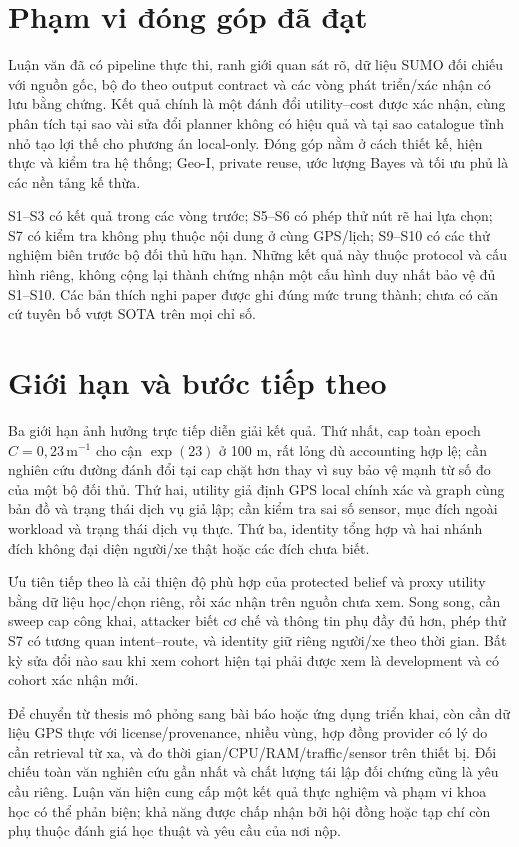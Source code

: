\section{Phạm vi đóng góp đã đạt}

Luận văn đã có pipeline thực thi, ranh giới quan sát rõ, dữ liệu SUMO đối chiếu với nguồn gốc, bộ đo theo output contract và các vòng phát triển/xác nhận có lưu bằng chứng. Kết quả chính là một đánh đổi utility--cost được xác nhận, cùng phân tích tại sao vài sửa đổi planner không có hiệu quả và tại sao catalogue tĩnh nhỏ tạo lợi thế cho phương án local-only. Đóng góp nằm ở cách thiết kế, hiện thực và kiểm tra hệ thống; Geo-I, private reuse, ước lượng Bayes và tối ưu phủ là các nền tảng kế thừa.

S1--S3 có kết quả trong các vòng trước; S5--S6 có phép thử nút rẽ hai lựa chọn; S7 có kiểm tra không phụ thuộc nội dung ở cùng GPS/lịch; S9--S10 có các thử nghiệm biên trước bộ đối thủ hữu hạn. Những kết quả này thuộc protocol và cấu hình riêng, không cộng lại thành chứng nhận một cấu hình duy nhất bảo vệ đủ S1--S10. Các bản thích nghi paper được ghi đúng mức trung thành; chưa có căn cứ tuyên bố vượt SOTA trên mọi chỉ số.

\section{Giới hạn và bước tiếp theo}

Ba giới hạn ảnh hưởng trực tiếp diễn giải kết quả. Thứ nhất, cap toàn epoch $C=0{,}23\,\mathrm m^{-1}$ cho cận $\exp(23)$ ở 100 m, rất lỏng dù accounting hợp lệ; cần nghiên cứu đường đánh đổi tại cap chặt hơn thay vì suy bảo vệ mạnh từ số đo của một bộ đối thủ. Thứ hai, utility giả định GPS local chính xác và graph cùng bản đồ và trạng thái dịch vụ giả lập; cần kiểm tra sai số sensor, mục đích ngoài workload và trạng thái dịch vụ thực. Thứ ba, identity tổng hợp và hai nhánh đích không đại diện người/xe thật hoặc các đích chưa biết.

Ưu tiên tiếp theo là cải thiện độ phù hợp của protected belief và proxy utility bằng dữ liệu học/chọn riêng, rồi xác nhận trên nguồn chưa xem. Song song, cần sweep cap công khai, attacker biết cơ chế và thông tin phụ đầy đủ hơn, phép thử S7 có tương quan intent--route, và identity giữ riêng người/xe theo thời gian. Bất kỳ sửa đổi nào sau khi xem cohort hiện tại phải được xem là development và có cohort xác nhận mới.

Để chuyển từ thesis mô phỏng sang bài báo hoặc ứng dụng triển khai, còn cần dữ liệu GPS thực với license/provenance, nhiều vùng, hợp đồng provider có lý do cần retrieval từ xa, và đo thời gian/CPU/RAM/traffic/sensor trên thiết bị. Đối chiếu toàn văn nghiên cứu gần nhất và chất lượng tái lập đối chứng cũng là yêu cầu riêng. Luận văn hiện cung cấp một kết quả thực nghiệm và phạm vi khoa học có thể phản biện; khả năng được chấp nhận bởi hội đồng hoặc tạp chí còn phụ thuộc đánh giá học thuật và yêu cầu của nơi nộp.

